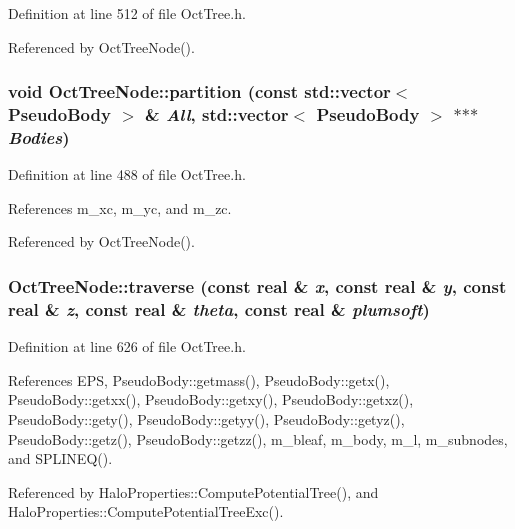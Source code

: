Definition at line 512 of file OctTree.h.



Referenced by OctTreeNode().

\subsubsection[{partition}]{\setlength{\rightskip}{0pt plus 5cm}void OctTreeNode::partition (const std::vector$<$ {\bf PseudoBody} $>$ \& {\em All}, \/  std::vector$<$ {\bf PseudoBody} $>$ $\ast$$\ast$$\ast$ {\em Bodies})}\label{classOctTreeNode_a5ad5e6ccfc85d5c027dc7d64fc87c5c2}


Definition at line 488 of file OctTree.h.



References m\_\-xc, m\_\-yc, and m\_\-zc.



Referenced by OctTreeNode().

\subsubsection[{traverse}]{ OctTreeNode::traverse (const {\bf real} \& {\em x}, \/  const {\bf real} \& {\em y}, \/  const {\bf real} \& {\em z}, \/  const {\bf real} \& {\em theta}, \/  const {\bf real} \& {\em plumsoft})}\label{classOctTreeNode_a0e30d64e4e7e5d525ff57656b9f570b0}


Definition at line 626 of file OctTree.h.



References EPS, PseudoBody::getmass(), PseudoBody::getx(), PseudoBody::getxx(), PseudoBody::getxy(), PseudoBody::getxz(), PseudoBody::gety(), PseudoBody::getyy(), PseudoBody::getyz(), PseudoBody::getz(), PseudoBody::getzz(), m\_\-bleaf, m\_\-body, m\_\-l, m\_\-subnodes, and SPLINEQ().



Referenced by HaloProperties::ComputePotentialTree(), and HaloProperties::ComputePotentialTreeExc().



